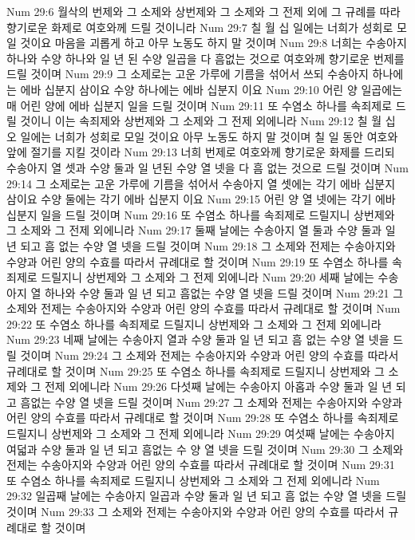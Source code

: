 Num 29:6  월삭의 번제와 그 소제와 상번제와 그 소제와 그 전제 외에 그 규례를 따라 향기로운 화제로 여호와께 드릴 것이니라
Num 29:7  칠 월 십 일에는 너희가 성회로 모일 것이요 마음을 괴롭게 하고 아무 노동도 하지 말 것이며
Num 29:8  너희는 수송아지 하나와 수양 하나와 일 년 된 수양 일곱을 다 흠없는 것으로 여호와께 향기로운 번제를 드릴 것이며
Num 29:9  그 소제로는 고운 가루에 기름을 섞어서 쓰되 수송아지 하나에는 에바 십분지 삼이요 수양 하나에는 에바 십분지 이요
Num 29:10  어린 양 일곱에는 매 어린 양에 에바 십분지 일을 드릴 것이며
Num 29:11  또 수염소 하나를 속죄제로 드릴 것이니 이는 속죄제와 상번제와 그 소제와 그 전제 외에니라
Num 29:12  칠 월 십 오 일에는 너희가 성회로 모일 것이요 아무 노동도 하지 말 것이며 칠 일 동안 여호와 앞에 절기를 지킬 것이라
Num 29:13  너희 번제로 여호와께 향기로운 화제를 드리되 수송아지 열 셋과 수양 둘과 일 년된 수양 열 넷을 다 흠 없는 것으로 드릴 것이며
Num 29:14  그 소제로는 고운 가루에 기름을 섞어서 수송아지 열 셋에는 각기 에바 십분지 삼이요 수양 둘에는 각기 에바 십분지 이요
Num 29:15  어린 양 열 넷에는 각기 에바 십분지 일을 드릴 것이며
Num 29:16  또 수염소 하나를 속죄제로 드릴지니 상번제와 그 소제와 그 전제 외에니라
Num 29:17  둘째 날에는 수송아지 열 둘과 수양 둘과 일 년 되고 흠 없는 수양 열 넷을 드릴 것이며
Num 29:18  그 소제와 전제는 수송아지와 수양과 어린 양의 수효를 따라서 규례대로 할 것이며
Num 29:19  또 수염소 하나를 속죄제로 드릴지니 상번제와 그 소제와 그 전제 외에니라
Num 29:20  세째 날에는 수송아지 열 하나와 수양 둘과 일 년 되고 흠없는 수양 열 넷을 드릴 것이며
Num 29:21  그 소제와 전제는 수송아지와 수양과 어린 양의 수효를 따라서 규례대로 할 것이며
Num 29:22  또 수염소 하나를 속죄제로 드릴지니 상번제와 그 소제와 그 전제 외에니라
Num 29:23  네째 날에는 수송아지 열과 수양 둘과 일 년 되고 흠 없는 수양 열 넷을 드릴 것이며
Num 29:24  그 소제와 전제는 수송아지와 수양과 어린 양의 수효를 따라서 규례대로 할 것이며
Num 29:25  또 수염소 하나를 속죄제로 드릴지니 상번제와 그 소제와 그 전제 외에니라
Num 29:26  다섯째 날에는 수송아지 아홉과 수양 둘과 일 년 되고 흠없는 수양 열 넷을 드릴 것이며
Num 29:27  그 소제와 전제는 수송아지와 수양과 어린 양의 수효를 따라서 규례대로 할 것이며
Num 29:28  또 수염소 하나를 속죄제로 드릴지니 상번제와 그 소제와 그 전제 외에니라
Num 29:29  여섯째 날에는 수송아지 여덟과 수양 둘과 일 년 되고 흠없는 수 양 열 넷을 드릴 것이며
Num 29:30  그 소제와 전제는 수송아지와 수양과 어린 양의 수효를 따라서 규례대로 할 것이며
Num 29:31  또 수염소 하나를 속죄제로 드릴지니 상번제와 그 소제와 그 전제 외에니라
Num 29:32  일곱째 날에는 수송아지 일곱과 수양 둘과 일 년 되고 흠 없는 수양 열 넷을 드릴 것이며
Num 29:33  그 소제와 전제는 수송아지와 수양과 어린 양의 수효를 따라서 규례대로 할 것이며
